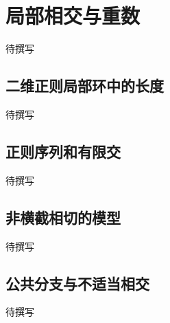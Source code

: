 
% 
% 

\section{局部相交与重数}
\label{g5:sec:2501}

待撰写

\subsection{二维正则局部环中的长度}
\label{g5:subsec:2501:01}
待撰写

\subsection{正则序列和有限交}
\label{g5:subsec:2501:02}
待撰写

\subsection{非横截相切的模型}
\label{g5:subsec:2501:03}
待撰写

\subsection{公共分支与不适当相交}
\label{g5:subsec:2501:04}
待撰写
